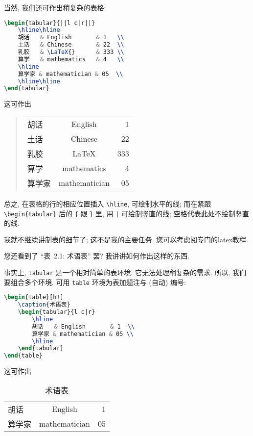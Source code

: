 当然, 我们还可作出稍复杂的表格:
\begin{lstlisting}[language=TeX]
\begin{tabular}{||l c|r||}
    \hline\hline
    胡话   & English       & 1   \\
    土话   & Chinese       & 22  \\
    乳胶   & \LaTeX{}      & 333 \\
    算学   & mathematics   & 4   \\
    \hline
    算学家 & mathematician & 05  \\
    \hline\hline
\end{tabular}
\end{lstlisting}
这可作出
\begin{quotation}
    \begin{tabular}{||l c|r||}
        \hline\hline
        胡话  & English       & 1   \\
        土话  & Chinese       & 22  \\
        乳胶  & \LaTeX{}      & 333 \\
        算学  & mathematics   & 4   \\
        \hline
        算学家 & mathematician & 05  \\
        \hline\hline
    \end{tabular}
\end{quotation}

总之, 在表格的行的相应位置插入 \verb`\hline`,
可绘制水平的线;
而在紧跟 \verb`\begin{tabular}` 后的
\verb`{` 跟 \verb`}` 里,
用 \verb`|` 可绘制竖直的线;
空格代表此处不绘制竖直的线.

我就不继续讲制表的细节了;
这不是我的主要任务.
您可以考虑阅专门的\gls{latex}教程.

您还看到了 ``表~2.1: 术语表'' 罢?
我讲讲如何作出这样的东西.

事实上, \verb`tabular` 是一个相对简单的表环境.
它无法处理稍复杂的需求.
所以, 我们要组合多个环境.
可用 \verb`table` 环境为表加题注与 (自动) 编号:
\begin{lstlisting}[language=TeX]
\begin{table}[h!]
    \caption{术语表}
    \begin{tabular}{l c|r}
        \hline
        胡话   & English       & 1  \\
        算学家 & mathematician & 05 \\
        \hline
    \end{tabular}
\end{table}
\end{lstlisting}
这可作出
\begin{table}[h!]
    \centering
    \caption{术语表}
    \begin{tabular}{l c|r}
        \hline
        胡话  & English       & 1  \\
        算学家 & mathematician & 05 \\
        \hline
    \end{tabular}
\end{table}

